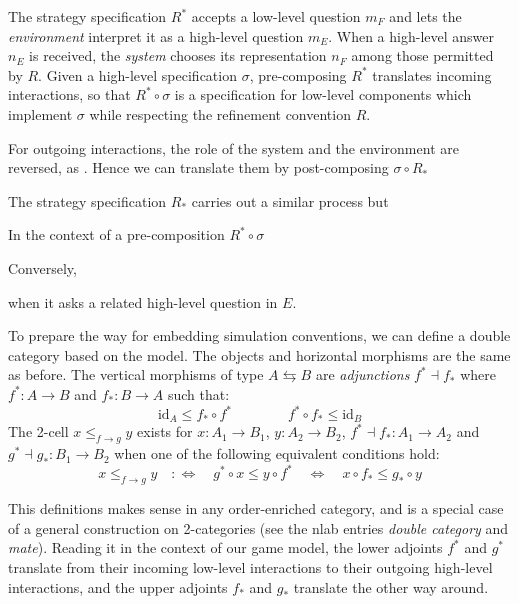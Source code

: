 \documentclass[sigplan,10pt,review,anonymous]{acmart}
\newcommand{\que}{{\circ}}
\newcommand{\ans}{{\bullet}}
\begin{document}
The strategy specification $R^*$
accepts a low-level question $m_F$ %
and lets the \emph{environment} interpret it as
a high-level question $m_E$. %
When a high-level answer $n_E$ is received, %
the \emph{system} chooses
its representation $n_F$ %
among those permitted by $R$.
Given a high-level specification $\sigma$,
pre-composing $R^*$ translates incoming interactions,
so that $R^* \circ \sigma$
is a specification for low-level components
which implement $\sigma$
while respecting the refinement convention $R$.

For outgoing interactions,
the role of the system and the environment are reversed,
as .
Hence we can translate them
by post-composing $\sigma \circ R_*$


The strategy specification $R_*$
carries out a similar process but





In the context of a pre-composition $R^* \circ \sigma$

Conversely,


when it asks a related high-level question in $E$.



To prepare the way for embedding simulation conventions,
we can define a double category based on the model.
The objects and horizontal morphisms
are the same as before.
The vertical morphisms of type $A \leftrightarrows B$
are \emph{adjunctions} $f^* \dashv f_*$
where $f^* : A \rightarrow B$ and $f_* : B \rightarrow A$
such that:
\[
  \mathrm{id}_A \le f_* \circ f^*
  \qquad \qquad
  f^* \circ f_* \le \mathrm{id}_B
\]
The 2-cell $x \le_{f \rightarrow g} y$
exists for
$x : A_1 \rightarrow B_1$,
$y : A_2 \rightarrow B_2$,
$f^* \dashv f_* : A_1 \rightarrow A_2$ and
$g^* \dashv g_* : B_1 \rightarrow B_2$
when one of the following equivalent conditions hold:
\begin{equation} \label{eqn:gc}
  x \le_{f \rightarrow g} y
  \quad :\Leftrightarrow \quad
  g^* \circ x \le y \circ f^*
  \quad \Leftrightarrow \quad
  x \circ f_* \le g_* \circ y
\end{equation}

This definitions makes sense in any order-enriched category,
and is a special case of a general construction on 2-categories
(see the nlab entries \emph{double category} and \emph{mate}).
Reading it in the context of our game model,
the lower adjoints $f^*$ and $g^*$
translate from their incoming low-level interactions
to their outgoing high-level interactions,
and the upper adjoints $f_*$ and $g_*$
translate the other way around.
\end{document}
